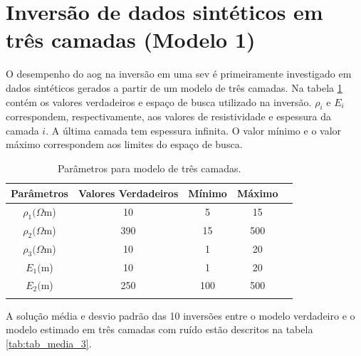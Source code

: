 
\section{Inversão de dados sintéticos em três camadas (Modelo 1)}
\label{sec:inversao_sinteticos}

O desempenho do \ac{aog} na inversão em uma \ac{sev} é primeiramente investigado em dados sintéticos gerados a partir de um modelo de três camadas. Na tabela \ref{tab:tab_sint_3} contém os valores verdadeiros e espaço de busca utilizado na inversão. $\rho_i$ e $E_i$ correspondem, respectivamente, aos valores de resistividade e espessura da camada $i$. A última camada tem espessura infinita. O valor mínimo e o valor máximo correspondem aos limites do espaço de busca.

\begin{table}[H]
    \centering
    \caption{Parâmetros para modelo de três camadas.}
    \begin{tabular}{@{}ccccc@{}}
        \toprule
        \textbf{Parâmetros}  & \textbf{Valores Verdadeiros} & \textbf{Mínimo}      & \textbf{Máximo}      \\ \midrule
        $\rho_1(\Omega$m)    & 10                           & 5                    & 15                   \\
        $\rho_2(\Omega$m)    & 390                          & 15                   & 500                  \\
        $\rho_3(\Omega$m)    & 10                           & 1                    & 20                   \\
        $E_1($m)             & 10                           & 1                    & 20                   \\
        $E_2($m)             & 250                          & 100                  & 500                  \\
        \multicolumn{1}{l}{} & \multicolumn{1}{l}{}         & \multicolumn{1}{l}{} & \multicolumn{1}{l}{} \\ \bottomrule
    \end{tabular}
    \label{tab:tab_sint_3}
\end{table}


A solução média e desvio padrão das 10 inversões entre o modelo verdadeiro e o modelo estimado em três camadas com ruído estão descritos na tabela \ref{tab:tab_media_3}.



